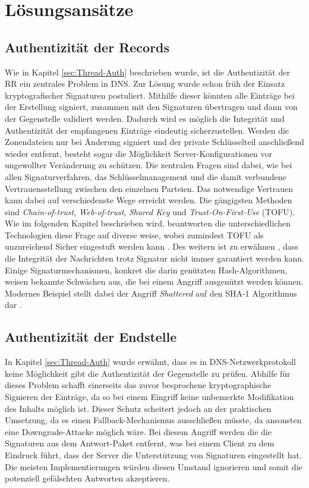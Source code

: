 \chapter{Lösungsansätze}
\label{chap:solutions}

\section{Authentizität der Records}
\label{sec:Solution-RecordAuth}

Wie in Kapitel \ref{sec:Thread-Auth} beschrieben wurde, ist die Authentizität der RR ein zentrales Problem in DNS. Zur Lösung wurde schon früh der Einsatz kryptografischer Signaturen postuliert. Mithilfe dieser könnten alle Einträge bei der Erstellung signiert, zusammen mit den Signaturen übertragen und dann von der Gegenstelle validiert werden. Dadurch wird es möglich die Integrität und Authentizität der empfangenen Einträge eindeutig sicherzustellen. Werden die Zonendateien nur bei Änderung signiert und der private Schlüsselteil anschließend wieder entfernt, besteht sogar die Möglichkeit Server-Konfigurationen vor ungewollter Veränderung zu schützen. 
Die zentralen Fragen sind dabei, wie bei allen Signaturverfahren, das Schlüsselmanagement und die damit verbundene Vertrauensstellung zwischen den einzelnen Parteien. Das notwendige Vertrauen kann dabei auf verschiedenste Wege erreicht werden. Die gängigsten Methoden sind \textit{Chain-of-trust}, \textit{Web-of-trust}, \textit{Shared Key} und \textit{Trust-On-First-Use} (TOFU). Wie im folgenden Kapitel beschrieben wird, beantworten die unterschiedlichen Technologien diese Frage auf diverse weise, wobei zumindest TOFU als unzureichend Sicher eingestuft werden kann \cite{Wendlandt2008}.
Des weitern ist zu erwähnen , dass die Integrität der Nachrichten trotz Signatur nicht immer garantiert werden kann. Einige Signaturmechanismen, konkret die darin genützten Hash-Algorithmen, weisen bekannte Schwächen aus, die bei einem Angriff ausgenützt werden können. Modernes Beispiel stellt dabei der Angriff \textit{Shattered} auf den SHA-1 Algorithmus dar \cite{Stevens2017}. 

\section{Authentizität der Endstelle}

In Kapitel \ref{sec:Thread-Auth} wurde erwähnt, dass es in DNS-Netzwerkprotokoll keine Möglichkeit gibt die Authentizität der Gegenstelle zu prüfen. Abhilfe für dieses Problem schafft einerseits das zuvor besprochene kryptographische Signieren der Einträge, da so bei einem Eingriff keine unbemerkte Modifikation des Inhalts möglich ist. Dieser Schutz scheitert jedoch an der praktischen Umsetzung, da es einen Fallback-Mechanismus ausschließen müsste, da ansonsten eine Downgrade-Attacke möglich wäre. Bei diesem Angriff werden die die Signaturen aus dem Antwort-Paket entfernt, was bei einem Client zu dem Eindruck führt, dass der Server die Unterstützung von Signaturen eingestellt hat. Die meisten Implementierungen würden diesen Umstand ignorieren und somit die potenziell gefälschten Antworten akzeptieren.  

